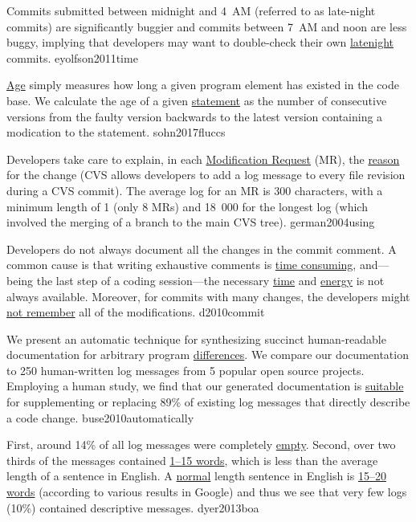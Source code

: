 \documentclass{article}
\begin{document}
  {Commits submitted between midnight and 4~AM (referred to as late-night commits) are significantly buggier and commits between 7~AM and noon are less buggy, implying that developers may want to double-check their own \ul{latenight} commits.}
  {eyolfson2011time}

  {\ul{Age} simply measures how long a given program element has existed in the code base. We calculate the age of a given \ul{statement} as the number of consecutive versions from the faulty version backwards to the latest version containing a modication to the statement.}
  {sohn2017fluccs}


  {Developers take care to explain, in each \ul{Modification Request} (MR), the \ul{reason} for the change (CVS allows developers to add a log message to every file revision during a CVS commit). The average log for an MR is 300 characters, with a minimum length of 1 (only 8 MRs) and 18~000 for the longest log (which involved the merging of a branch to the main CVS tree).}
  {german2004using}

  {Developers do not always document all the changes in the commit comment. A common cause is that writing exhaustive comments is \ul{time consuming}, and---being the last step of a coding session---the necessary \ul{time} and \ul{energy} is not always available. Moreover, for commits with many changes, the developers might \ul{not remember} all of the modifications.}
  {d2010commit}

  {We present an automatic technique for synthesizing succinct human-readable documentation for arbitrary program \ul{differences}. We compare our documentation to 250 human-written log messages from 5 popular open source projects. Employing a human study, we find that our generated documentation is \ul{suitable} for supplementing or replacing 89\% of existing log messages that directly describe a code change.}
  {buse2010automatically}

  {First, around 14\% of all log messages were completely \ul{empty}. Second, over two thirds of the messages contained \ul{1–15 words}, which is less than the average length of a sentence in English. A \ul{normal} length sentence in English is \ul{15–20 words} (according to various results in Google) and thus we see that very few logs (10\%) contained descriptive messages.}
  {dyer2013boa}
\end{document}
